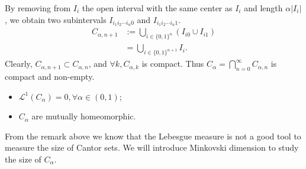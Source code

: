     By removing from $I_{i}$ the open interval with the same center as $I_{i}$ and length $\alpha \left\vert I_{i} \right\vert $, we obtain two subintervals $I_{i_1i_2\cdots i_n 0}$ and $I_{i_1i_2\cdots i_{n}1}$.
        $$
        \begin{aligned}
        C_{\alpha,n+1} &:= \bigcup_{i \in \{0,1\}^{n}} \left( I_{i0} \cup I_{i1} \right) \\
        &= \bigcup_{i \in \{0,1\}^{n+1}} I_{i}.
        \end{aligned}
        $$
    Clearly, $C_{\alpha,n+1} \subset C_{\alpha,n}$, and $\forall k, C_{\alpha,k}$ is compact. Thus $C_\alpha = \bigcap_{n=0}^\infty C_{\alpha,n}$ is compact and non-empty.

    \begin{remark}
        \begin{itemize}
            \item[(i)] $\mathcal{L}^{1}(C_{\alpha})=0 ,\forall \alpha \in (0,1)$;
            \item[(ii)] $C_\alpha$ are mutually homeomorphic.
        \end{itemize}
    \end{remark}

    From the remark above we know that the Lebesgue measure is not a good tool to measure the size of Cantor sets. We will introduce Minkovski dimension to study the size of $C_\alpha$.

